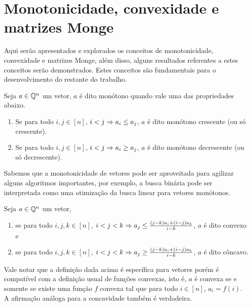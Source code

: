 \section{Monotonicidade, convexidade e matrizes Monge}
\label{MatrizMonge}


Aqui serão apresentados e explorados os conceitos de monotonicidade, convexidade e matrizes Monge, além disso, alguns resultados referentes a estes conceitos serão demonstrados. Estes conceitos são fundamentais para o desenvolvimento do restante do trabalho.

\begin{defi}
Seja $a \in \mathbb{Q}^n$ um vetor, $a$ é dito monótono quando vale uma das propriedades abaixo.
    \begin{enumerate}
        \item Se para todo $i,j \in [n]$, $i < j \Rightarrow a_i \leq a_j$, $a$ é dito monótono crescente (ou só crescente).
        \item Se para todo $i,j \in [n]$, $i < j \Rightarrow a_i \geq a_j$, $a$ é dito monótono decrescente (ou só decrescente).
    \end{enumerate}
\end{defi}

Sabemos que a monotonicidade de vetores pode ser aproveitada para agilizar alguns algoritmos importantes, por exemplo, a busca binária pode ser interpretada como uma otimização da busca linear para vetores monótonos. 

\begin{defi}
Seja $a \in \mathbb{Q}^n$ um vetor,
    \begin{enumerate}
        \item se para todo $i,j,k \in [n]$, $i < j < k \Rightarrow a_j \leq \frac{(j-k)a_i + (i-j)a_k}{i-k}$, $a$ é dito convexo e
        \item se para todo $i,j,k \in [n]$, $i < j < k \Rightarrow a_j \geq \frac{(j-k)a_i + (i-j)a_k}{i-k}$, $a$ é dito côncavo.
    \end{enumerate}
\end{defi}

Vale notar que a definição dada acima é específica para vetores porém é compatível com a definição usual de funções convexas, isto é, $a$ é convexa se e somente se existe uma função $f$ convexa tal que para todo $i \in [n]$, $a_i = f(i)$. A afirmação análoga para a concavidade também é verdadeira.  

